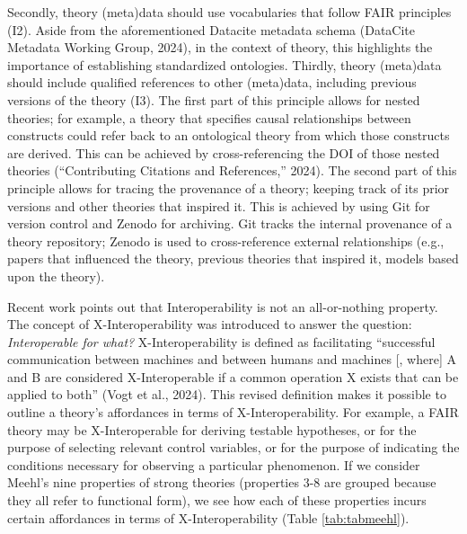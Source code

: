 \documentclass[
  man, noextraspace,floatsintext]{apa6}
\begin{document}
Secondly, theory (meta)data should use vocabularies that follow FAIR principles (I2).
Aside from the aforementioned Datacite metadata schema (DataCite Metadata Working Group, 2024),
in the context of theory, this highlights the importance of establishing standardized ontologies.
Thirdly, theory (meta)data should include qualified references to other (meta)data, including previous versions of the theory (I3).
The first part of this principle allows for nested theories;
for example, a theory that specifies causal relationships between constructs could refer back to an ontological theory from which those constructs are derived.
This can be achieved by cross-referencing the DOI of those nested theories ({``Contributing {Citations} and {References},''} 2024).
The second part of this principle allows for tracing the provenance of a theory; keeping track of its prior versions and other theories that inspired it.
This is achieved by using Git for version control and Zenodo for archiving.
Git tracks the internal provenance of a theory repository; Zenodo is used to cross-reference external relationships (e.g., papers that influenced the theory, previous theories that inspired it, models based upon the theory).

Recent work points out that Interoperability is not an all-or-nothing property.
The concept of X-Interoperability was introduced to answer the question: \emph{Interoperable for what?}
X-Interoperability is defined as facilitating ``successful communication between machines and between humans and machines {[}, where{]} A and B are considered X-Interoperable if a common operation X exists that can be applied to both'' (Vogt et al., 2024).
This revised definition makes it possible to outline a theory's affordances in terms of X-Interoperability.
For example, a FAIR theory may be X-Interoperable for deriving testable hypotheses,
or for the purpose of selecting relevant control variables,
or for the purpose of indicating the conditions necessary for observing a particular phenomenon.
If we consider Meehl's nine properties of strong theories (properties 3-8 are grouped because they all refer to functional form),
we see how each of these properties incurs certain affordances in terms of X-Interoperability (Table \ref{tab:tabmeehl}).
\end{document}

